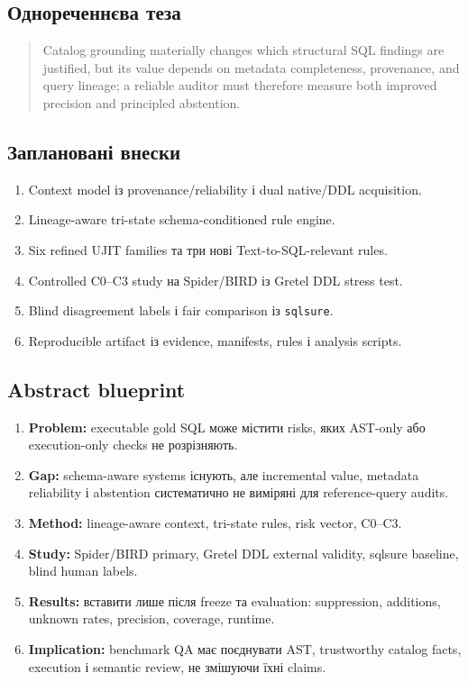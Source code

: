 \documentclass[11pt,a4paper]{article}
\begin{document}
\subsection{Однореченнєва теза}

\begin{quote}
Catalog grounding materially changes which structural SQL findings are justified,
but its value depends on metadata completeness, provenance, and query lineage; a
reliable auditor must therefore measure both improved precision and principled
abstention.
\end{quote}

\subsection{Заплановані внески}

\begin{enumerate}
\item Context model із provenance/reliability і dual native/DDL acquisition.
\item Lineage-aware tri-state schema-conditioned rule engine.
\item Six refined UJIT families та три нові Text-to-SQL-relevant rules.
\item Controlled C0--C3 study на Spider/BIRD із Gretel DDL stress test.
\item Blind disagreement labels і fair comparison із \texttt{sqlsure}.
\item Reproducible artifact із evidence, manifests, rules і analysis scripts.
\end{enumerate}

\subsection{Abstract blueprint}

\begin{enumerate}
\item \textbf{Problem:} executable gold SQL може містити risks, яких AST-only або
      execution-only checks не розрізняють.
\item \textbf{Gap:} schema-aware systems існують, але incremental value, metadata
      reliability і abstention систематично не виміряні для reference-query audits.
\item \textbf{Method:} lineage-aware context, tri-state rules, risk vector, C0--C3.
\item \textbf{Study:} Spider/BIRD primary, Gretel DDL external validity, sqlsure baseline,
      blind human labels.
\item \textbf{Results:} вставити лише після freeze та evaluation: suppression,
      additions, unknown rates, precision, coverage, runtime.
\item \textbf{Implication:} benchmark QA має поєднувати AST, trustworthy catalog facts,
      execution і semantic review, не змішуючи їхні claims.
\end{enumerate}
\end{document}
